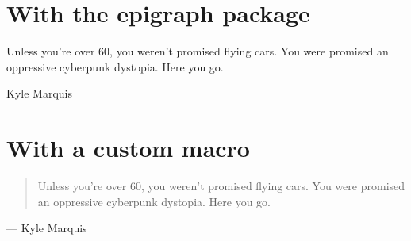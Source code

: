 \documentclass{article}
\begin{document}
\section{With the epigraph package}

\setlength{\epigraphwidth}{\dimexpr .7 \textwidth}

\epigraph{Unless you're over 60, you weren't promised flying cars. You were promised
  an oppressive cyberpunk dystopia. Here you go.}
{Kyle Marquis}

\section{With a custom macro}

\renewcommand{\epigraph}[2]{
    \hfill\begin{minipage}{\dimexpr\textwidth-1cm}%
    \begin{quotation}%
        #1%
    \end{quotation}%
    \begin{flushright}%
        --- #2%
    \end{flushright}%
    \end{minipage}%
}

\epigraph{Unless you're over 60, you weren't promised flying cars. You were promised
  an oppressive cyberpunk dystopia. Here you go.}
{Kyle Marquis}
\end{document}
